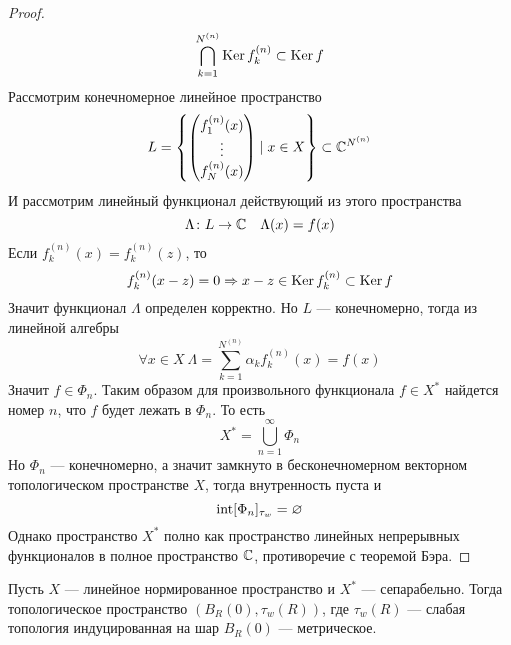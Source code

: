 \begin{proof}
	$$
		\bigcap_{k=1}^{N^{(n)}} \operatorname{Ker} f_k^{(n)} \subset \operatorname{Ker} f
	$$
	Рассмотрим конечномерное линейное пространство 
	$$
		L = \left\{\begin{pmatrix}
		f_1^{(n)}(x) \\
		\vdots \\
		f_N^{(n)}(x)
	\end{pmatrix} \mid x \in X\right\} \subset \mathbb{C}^{N^{(n)}}
	$$
	И рассмотрим линейный функционал действующий из этого пространства 
	$$
	\Lambda \colon L \to \mathbb{C} \quad \Lambda(x) = f(x)
	$$
	Если $f_k^{(n)}(x) = f_k^{(n)}(z)$, то 
	$$
	f_k^{(n)}(x -z) = 0 \Rightarrow x - z \in \operatorname{Ker} f_k^{(n)} \subset \operatorname{Ker} f 
	$$
	Значит функционал $\Lambda$ определен корректно. Но $L$ --- конечномерно, тогда из линейной алгебры 
	$$
	\forall x \in X \ \Lambda = \sum_{k=1}^{N^{(n)}} \alpha_k f_k^{(n)}(x) = f(x)
	$$
	Значит $f \in \Phi_n$.
	Таким образом для произвольного функционала $f \in X^*$ найдется номер $n$, что $f$ будет лежать в $\Phi_n$. То есть 
	$$
	X^* = \bigcup_{n=1}^\infty \Phi_n
	$$
	Но $\Phi_n$ --- конечномерно, а значит замкнуто в бесконечномерном векторном топологическом пространстве $X$, тогда внутренность пуста и
	$$
	\operatorname{int} [\Phi_n]_{\tau_w} = \varnothing
	$$
	Однако пространство $X^*$ полно как пространство линейных непрерывных функционалов в полное пространство $\mathbb{C}$, противоречие с теоремой Бэра. 
\end{proof}
\begin{theorem}
	Пусть $X$ --- линейное нормированное пространство и $X^*$ --- сепарабельно. Тогда топологическое пространство $(B_R(0), \tau_w(R))$, где $\tau_w(R)$ --- слабая топология индуцированная на шар $B_R(0)$ --- метрическое.
\end{theorem}
